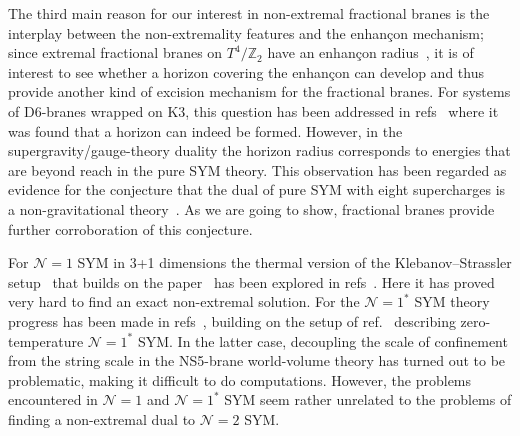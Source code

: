 \documentclass[a4paper,11pt]{article}
\newcommand{\ZZ}{\mathbb{Z}}  \newcommand{\Zint}{\mathbb{Z}}
\begin{document}
The third main reason for our interest in non-extremal fractional
branes is the interplay between the non-extremality features and the
enhan\c{c}on mechanism; since extremal fractional branes on $T^4\!/\ZZ_2$ 
have an enhan\c{c}on radius~\cite{Frau:2000gk}, it is of interest to see
whether a horizon covering the enhan\c{c}on can develop and thus provide
another kind of excision mechanism for the fractional branes. For systems
of D6-branes wrapped on K3, this question has been addressed in
refs~\cite{Johnson:1999qt,Johnson:2001wm} where it was found that a
horizon can indeed be formed. However, in the supergravity/gauge-theory
duality the horizon radius corresponds to energies that are beyond reach
in the pure SYM theory. This observation has been regarded as evidence
for the conjecture that the dual of pure SYM with eight supercharges is
a non-gravitational theory~\cite{Johnson:1999qt,Wijnholt:2001us}. As we
are going to show, fractional branes provide further corroboration of this
conjecture.

For $\mathcal{N}=1$ SYM in 3+1 dimensions the thermal version of the
Klebanov--Strassler setup~\cite{Klebanov:2000hb} that builds on the
paper~\cite{Klebanov:1996un} has been explored in
refs~\cite{Buchel:2000ch,Buchel:2001gw,Gubser:2001ri}. Here it has
proved very hard to find an exact non-extremal solution. For the
$\mathcal{N}=1^*$ SYM theory progress has been made in
refs~\cite{Freedman:2000xb,Maldacena:2000yy,Gubser:2001eg,Buchel:2001dg},
building on the setup of ref.~\cite{Polchinski:2000uf} describing
zero-temperature $\mathcal{N}=1^*$ SYM. In the latter case, decoupling
the scale of confinement from the string scale in the NS5-brane
world-volume theory has turned out to be problematic, making it
difficult to do computations. However, the problems encountered in
$\mathcal{N}=1$ and  $\mathcal{N}=1^*$ SYM seem rather unrelated to
the problems of finding a non-extremal dual to $\mathcal{N}=2$ SYM.
\end{document}
